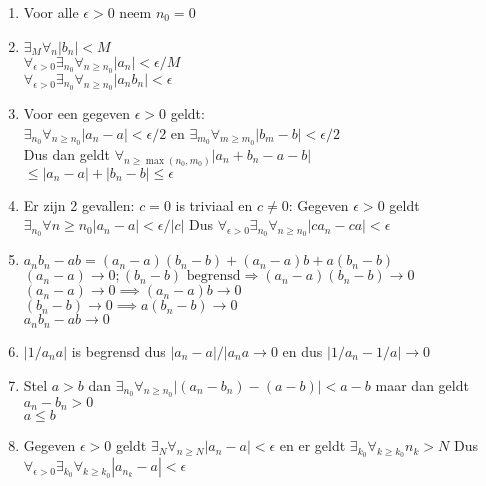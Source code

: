 \begin{enumerate}[label=\roman*)]
	\item{
		Voor alle $\epsilon>0$ neem $n_0=0$
	}
	\item{
		$\exists_M\forall_n\left|b_n\right|<M$\\
		$\forall_{\epsilon>0}\exists_{n_0}\forall_{n\geq n_0}\left|a_n\right|<\epsilon/M$\\
		$\forall_{\epsilon>0}\exists_{n_0}\forall_{n\geq n_0}\left|a_nb_n\right|<\epsilon$
	}
	\item{
		Voor een gegeven $\epsilon>0$ geldt:\\
		$\exists_{n_0}\forall_{n\geq n_0}|a_n-a|<\epsilon/2$ en $\exists_{m_0}\forall_{m\geq m_0}|b_m-b|<\epsilon/2$\\
		Dus dan geldt $\forall_{n\geq\max(n_0,m_0)}|a_n+b_n-a-b|$\\$\leq|a_n-a|+|b_n-b|\leq\epsilon$
	}
	\item{
		Er zijn 2 gevallen: $c=0$ is triviaal en $c\neq0$:
		Gegeven $\epsilon>0$ geldt $\exists_{n_0}\forall{n\geq n_0}|a_n-a|<\epsilon/|c|$
		Dus $\forall_{\epsilon>0}\exists_{n_0}\forall_{n\geq n_0}|ca_n-ca|<\epsilon$
	}
	\item{
		$a_nb_n-ab=(a_n-a)(b_n-b)+(a_n-a)b+a(b_n-b)$\\
		$(a_n-a)\to0;(b_n-b)\text{ begrensd}\Rightarrow(a_n-a)(b_n-b)\to0$\\
		$(a_n-a)\to0\implies(a_n-a)b\to0$\\
		$(b_n-b)\to0\implies a(b_n-b)\to0$\\
		$a_nb_n-ab\to0$
	}
	\item{
		$|1/a_na|$ is begrensd dus $|a_n-a|/|a_na\to0$ en dus $|1/a_n-1/a|\to0$
	}
	\item{
		Stel $a>b$ dan $\exists_{n_0}\forall_{n\geq n_0}|(a_n-b_n)-(a-b)|<a-b$ maar dan geldt $a_n-b_n>0$ \lightning\\
		$a\leq b$
	}
	\item{
		Gegeven $\epsilon>0$ geldt $\exists_{N}\forall_{n\geq N}|a_n-a|<\epsilon$ en er geldt $\exists_{k_0}\forall_{k\geq k_0}n_k>N$
		Dus $\forall_{\epsilon>0}\exists_{k_0}\forall_{k\geq k_0}|a_{n_k}-a|<\epsilon$
	}
\end{enumerate}